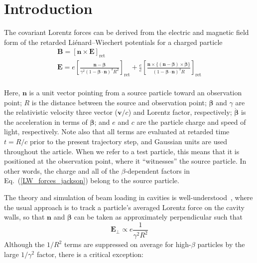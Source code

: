 \documentclass[reprint,
               amsmath,amssymb,nofootinbib, aps%
              ]{revtex4-2}
\begin{document}
\maketitle
\section{\label{sec:Introduction}Introduction}

The covariant Lorentz forces can be derived from the electric and magnetic field form of the retarded Liénard--Wiechert potentials for a charged particle~\cite{jackson2012classical}
\begin{equation}
\begin{gathered}
\mathbf{B}=[\mathbf{n} \times \mathbf{E}]_{\mathrm{ret}} \\
\mathbf{E}=e\left[\frac{\mathbf{n}-\boldsymbol{\beta}}{\gamma^{2}(1-\boldsymbol{\beta} \cdot \mathbf{n})^{3} R^{2}}\right]_{\mathrm{ret}}+\frac{e}{c}\left[\frac{\mathbf{n} \times\{(\mathbf{n}-\boldsymbol{\beta}) \times \dot{\boldsymbol{\beta}}\}}{(1-\boldsymbol{\beta} \cdot \mathbf{n})^{3} R}\right]_{\mathrm{ret}}
\nonumber \\
\label{LW_forces_jackson}
\end{gathered}
\end{equation}
\vspace{-0.2cm}

\noindent Here, $\mathbf{n}$ is a unit vector pointing from a source particle toward an observation point; $R$ is the distance between the source and observation point; $\boldsymbol{\beta}$ and $\gamma$ are the relativistic velocity three vector ($\textbf{v}/c$) and Lorentz factor, respectively; $\dot{\boldsymbol{\beta}}$ is the acceleration in terms of $\boldsymbol{\beta}$; and $e$ and $c$ are the particle charge and speed of light, respectively. Note also that all terms are evaluated at retarded time $t = R / c$ prior to the present trajectory step, and Gaussian units are used throughout the article. When we refer to a test particle, this means that it is positioned at the observation point, where it ``witnesses'' the source particle. In other words, the charge and all of the $\beta$-dependent factors in Eq.~(\ref{LW_forces_jackson}) belong to the source particle.

The theory and simulation of beam loading in cavities is well-understood~\cite{wolski2014beam}, where the usual approach is to track a particle's averaged Lorentz force on the cavity walls, so that $\boldsymbol{n}$ and $\boldsymbol{\beta}$ can be taken as approximately perpendicular such that
\begin{equation}
    \boldsymbol{E_\perp} \propto e\frac{1}{\gamma^2 R^2}
\end{equation}
\noindent Although the $1/R^2$ terms are suppressed on average for high-$\beta$ particles by the large $1/\gamma^2$ factor, there is a critical exception:
\end{document}
